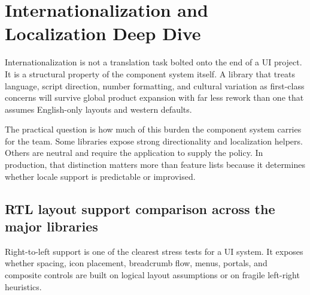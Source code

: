 \clearpage
\section{Internationalization and Localization Deep Dive}

Internationalization is not a translation task bolted onto the end of a UI project. It is a structural property of the component system itself. A library that treats language, script direction, number formatting, and cultural variation as first-class concerns will survive global product expansion with far less rework than one that assumes English-only layouts and western defaults.

The practical question is how much of this burden the component system carries for the team. Some libraries expose strong directionality and localization helpers. Others are neutral and require the application to supply the policy. In production, that distinction matters more than feature lists because it determines whether locale support is predictable or improvised.

\subsection{RTL layout support comparison across the major libraries}
Right-to-left support is one of the clearest stress tests for a UI system. It exposes whether spacing, icon placement, breadcrumb flow, menus, portals, and composite controls are built on logical layout assumptions or on fragile left-right heuristics.

